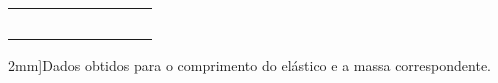 \begin{table*}
\begin{center}
\begin{tabular}{lp{20mm}p{20mm}p{20mm}lp{20mm}p{20mm}p{20mm}l}
		& \cellcolor[gray]{0.95} & \cellcolor[gray]{0.97} & \cellcolor[gray]{0.95} & & \cellcolor[gray]{0.95} & \cellcolor[gray]{0.97} & \cellcolor[gray]{0.95} & \\
		& \cellcolor[gray]{0.89} & \cellcolor[gray]{0.92} & \cellcolor[gray]{0.89} & & \cellcolor[gray]{0.89} & \cellcolor[gray]{0.92} & \cellcolor[gray]{0.89} & \\
		& \cellcolor[gray]{0.95} & \cellcolor[gray]{0.97} & \cellcolor[gray]{0.95} & & \cellcolor[gray]{0.95} & \cellcolor[gray]{0.97} & \cellcolor[gray]{0.95} & \\
		& \cellcolor[gray]{0.89} & \cellcolor[gray]{0.92} & \cellcolor[gray]{0.89} & & \cellcolor[gray]{0.89} & \cellcolor[gray]{0.92} & \cellcolor[gray]{0.89} & \\
		& \cellcolor[gray]{0.95} & \cellcolor[gray]{0.97} & \cellcolor[gray]{0.95} & & \cellcolor[gray]{0.95} & \cellcolor[gray]{0.97} & \cellcolor[gray]{0.95} & \\
\bottomrule
		\end{tabular}
	\caption[][2mm]{Dados obtidos para o comprimento do elástico e a massa correspondente.}\label{Tab:ResistoresOhmicosENaoOhmicos}
	\end{center}
\end{table*}

